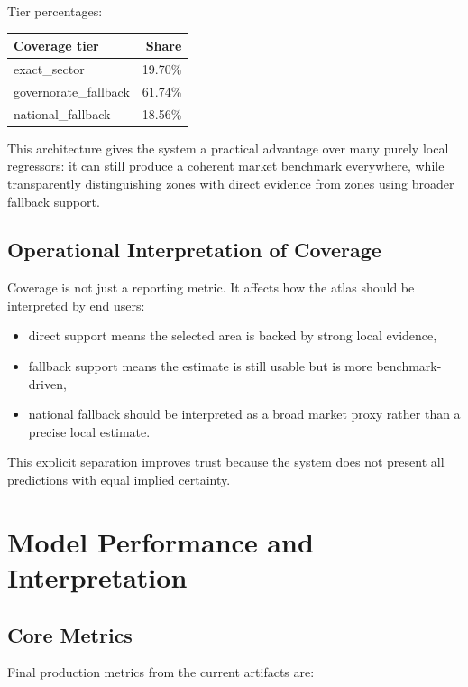 \documentclass[11pt,a4paper]{article}
\begin{document}
Tier percentages:

\begin{center}
\begin{tabular}{lr}
\toprule
Coverage tier & Share \\
\midrule
exact\_sector & 19.70\% \\
governorate\_fallback & 61.74\% \\
national\_fallback & 18.56\% \\
\bottomrule
\end{tabular}
\end{center}

This architecture gives the system a practical advantage over many purely local regressors: it can still produce a coherent market benchmark everywhere, while transparently distinguishing zones with direct evidence from zones using broader fallback support.

\subsection{Operational Interpretation of Coverage}

Coverage is not just a reporting metric. It affects how the atlas should be interpreted by end users:

\begin{itemize}
\item direct support means the selected area is backed by strong local evidence,
\item fallback support means the estimate is still usable but is more benchmark-driven,
\item national fallback should be interpreted as a broad market proxy rather than a precise local estimate.
\end{itemize}

This explicit separation improves trust because the system does not present all predictions with equal implied certainty.

\section{Model Performance and Interpretation}

\subsection{Core Metrics}

Final production metrics from the current artifacts are:
\end{document}
